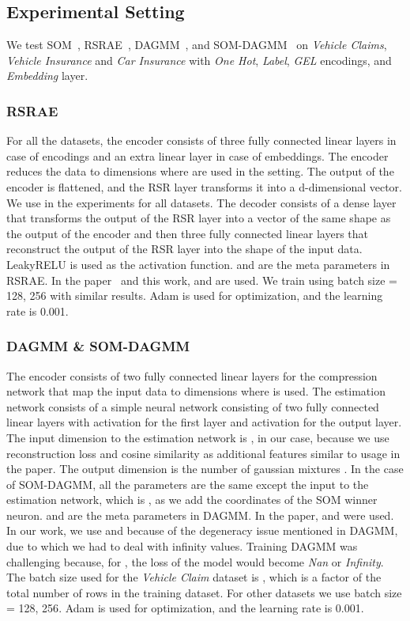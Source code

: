 \documentclass{article}
\begin{document}
\subsection{Experimental Setting}\label{a5}


We test SOM~\citep{som}, RSRAE~\citep{rsrae}, DAGMM~\citep{dagmm}, and SOM-DAGMM~\citep{som} on \textit{Vehicle Claims}, \textit{Vehicle Insurance} and \textit{Car Insurance} with \textit{One Hot}, \textit{Label}, \textit{GEL} encodings, and \textit{Embedding} layer. 

\subsubsection{RSRAE}
 For all the datasets, the encoder consists of three fully connected linear layers in case of encodings and an extra linear layer in case of embeddings. The encoder reduces the data to  dimensions where    are used in the setting. The output of the encoder is flattened, and the RSR layer transforms it into a d-dimensional vector. We use  in the experiments for all datasets. The decoder consists of a dense layer that transforms the output of the RSR layer into a vector of the same shape as the output of the encoder and then three fully connected linear layers that reconstruct the output of the RSR layer into the shape of the input data. LeakyRELU is used as the activation function. 
 and  are the meta parameters in RSRAE. In the paper~\citep{rsrae} and this work,  and  are used. We train using batch size = {128, 256} with similar results. Adam is used for optimization, and the learning rate is 0.001. 

\subsubsection{DAGMM \& SOM-DAGMM}

The encoder consists of two fully connected linear layers for the compression network that map the input data to  dimensions where  is used. The estimation network consists of a simple neural network consisting of two fully connected linear layers with  activation for the first layer and  activation for the output layer. The input dimension to the estimation network is , in our case, because we use reconstruction loss and cosine similarity as additional features similar to usage in the paper. The output dimension is the number of gaussian mixtures . In the case of SOM-DAGMM, all the parameters are the same except the input to the estimation network, which is , as we add the coordinates of the SOM winner neuron.
 and  are the meta parameters in DAGMM. In the paper,  and  were used. In our work, we use   and   because of the degeneracy issue mentioned in DAGMM, due to which we had to deal with infinity values. Training DAGMM was challenging because, for  , the loss of the model would become \textit{Nan} or \textit{Infinity}. The batch size used for the \textit{Vehicle Claim} dataset is , which is a factor of the total number of rows in the training dataset. For other datasets we use batch size = {128, 256}. Adam is used for optimization, and the learning rate is 0.001. 
\end{document}
